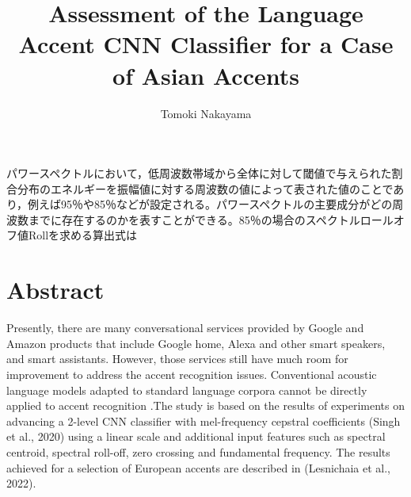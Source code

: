 パワースペクトルにおいて，低周波数帯域から全体に対して閾値で与えられた割合分布のエネルギーを振幅値に対する周波数の値によって表された値のことであり，例えば95％や85％などが設定される。パワースペクトルの主要成分がどの周波数までに存在するのかを表すことができる。85％の場合のスペクトルロールオフ値Rollを求める算出式は\documentclass[ams]{U-AizuGT}
\author{Tomoki Nakayama}
\title{Assessment of the Language Accent CNN Classifier for a Case of Asian Accents}
\begin{document}
\maketitle

\section{Abstract}
Presently, there are many conversational services provided by Google and Amazon products that include Google home, Alexa and other smart speakers, and smart assistants. However, those services still have much room for improvement to address the accent recognition issues. Conventional acoustic language models adapted to standard language corpora cannot be directly applied to accent recognition .The study is based on the results of experiments on advancing a 2-level CNN classifier with mel-frequency cepstral coefficients (Singh et al., 2020) using a linear scale and additional input features such as spectral centroid, spectral roll-off, zero crossing and fundamental frequency. The results achieved for a selection of European accents are described in (Lesnichaia et al., 2022). 
\end{document}
